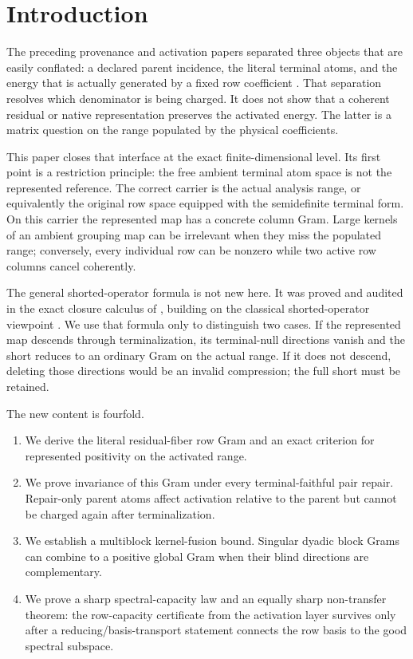\section{Introduction}

The preceding provenance and activation papers separated three objects that
are easily conflated: a declared parent incidence, the literal terminal atoms,
and the energy that is actually generated by a fixed row coefficient
\citep{WangTPC63,WangTPC64}.  That separation resolves which denominator is
being charged.  It does not show that a coherent residual or native
representation preserves the activated energy.  The latter is a matrix
question on the range populated by the physical coefficients.

This paper closes that interface at the exact finite-dimensional level.  Its
first point is a restriction principle: the free ambient terminal atom space
is not the represented reference.  The correct carrier is the actual analysis
range, or equivalently the original row space equipped with the semidefinite
terminal form.  On this carrier the represented map has a concrete column
Gram.  Large kernels of an ambient grouping map can be irrelevant when they
miss the populated range; conversely, every individual row can be nonzero while
two active row columns cancel coherently.

The general shorted-operator formula is not new here.  It was proved and
audited in the exact closure calculus of \citet{WangTPC62}, building on the
classical shorted-operator viewpoint \citep{AndersonTrapp1975}.  We use that
formula only to distinguish two cases.  If the represented map descends through
terminalization, its terminal-null directions vanish and the short reduces to
an ordinary Gram on the actual range.  If it does not descend, deleting those
directions would be an invalid compression; the full short must be retained.

The new content is fourfold.
\begin{enumerate}[label=(\roman*)]
\item We derive the literal residual-fiber row Gram and an exact criterion for
represented positivity on the activated range.
\item We prove invariance of this Gram under every terminal-faithful pair
repair.  Repair-only parent atoms affect activation relative to the parent but
cannot be charged again after terminalization.
\item We establish a multiblock kernel-fusion bound.  Singular dyadic block
Grams can combine to a positive global Gram when their blind directions are
complementary.
\item We prove a sharp spectral-capacity law and an equally sharp non-transfer
theorem: the row-capacity certificate from the activation layer survives only
after a reducing/basis-transport statement connects the row basis to the good
spectral subspace.
\end{enumerate}

